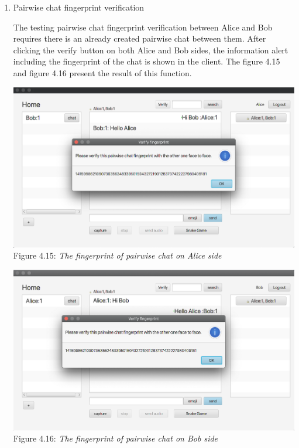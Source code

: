 \begin{enumerate}[label=(\roman*)]
\item Pairwise chat fingerprint verification

The testing pairwise chat fingerprint verification between Alice and Bob requires there is an already created pairwise chat between them. After clicking the verify button on both Alice and Bob sides, the information alert including the fingerprint of the chat is shown in the client. The figure 4.15 and figure 4.16 present the result of this function.

\begin{center}
\includegraphics[scale=.45]{../4-Implementation/resources/fingerprint-Alice.png}\\
Figure 4.15: \textit{The fingerprint of pairwise chat on Alice side}
\end{center}

\begin{center}
\includegraphics[scale=.45]{../4-Implementation/resources/fingerprint-Bob.png}\\
Figure 4.16: \textit{The fingerprint of pairwise chat on Bob side}
\end{center}

\end{enumerate}

